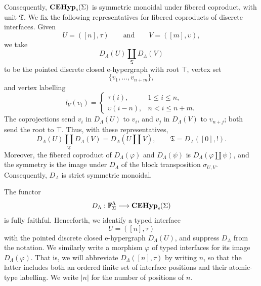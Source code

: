 Consequently,
\(\mathbf{CEHyp}_{\mathrm{s}}(\Sigma)\) is symmetric monoidal under
fibered coproduct, with unit \(\mathfrak T\). We fix the following
representatives for fibered coproducts of discrete interfaces. Given
\[
  U=([n],\tau)
  \qquad\text{and}\qquad
  V=([m],\upsilon),
\]
we take
\[
  D_\Lambda(U)\coprod_{\mathfrak T}D_\Lambda(V)
\]
to be the pointed discrete closed e-hypergraph with root \(\top\),
vertex set
\[
  \{v_1,\ldots,v_{n+m}\},
\]
and vertex labelling
\[
  l_V(v_i)=
  \begin{cases}
    \tau(i), & 1\leq i\leq n,\\
    \upsilon(i-n), & n<i\leq n+m.
  \end{cases}
\]
The coprojections send \(v_i\) in \(D_\Lambda(U)\) to \(v_i\), and
\(v_j\) in \(D_\Lambda(V)\) to \(v_{n+j}\); both send the root to
\(\top\). Thus, with these representatives,
\[
  D_\Lambda(U)\coprod_{\mathfrak T}D_\Lambda(V)
  =
  D_\Lambda(U\coprod V),
  \qquad
  \mathfrak T=D_\Lambda([0],!).
\]
Moreover, the fibered coproduct of
\(D_\Lambda(\varphi)\) and \(D_\Lambda(\psi)\) is
\(D_\Lambda(\varphi\coprod\psi)\), and the symmetry is the image under
\(D_\Lambda\) of the block transposition \(\sigma_{U,V}\).
Consequently, \(D_\Lambda\) is strict symmetric monoidal.

\begin{remark}
\label{rem:lambda-suppress-D}
The functor
\[
  D_\Lambda:
  \mathbb F^\Lambda_\Sigma
  \longrightarrow
  \mathbf{CEHyp}_{\mathrm{s}}(\Sigma)
\]
is fully faithful. Henceforth, we identify a typed interface
\[
  U=([n],\tau)
\]
with the pointed discrete closed e-hypergraph \(D_\Lambda(U)\), and
suppress \(D_\Lambda\) from the notation. We similarly write a morphism
\(\varphi\) of typed interfaces for its image \(D_\Lambda(\varphi)\).
That is, we will abbreviate $D_{\Lambda}([n], \tau)$ by writing $n$, so that the latter
includes both an ordered finite set of interface positions
and their atomic-type labelling.  
We write \(|n|\) for the number of positions of \(n\).
\end{remark}

